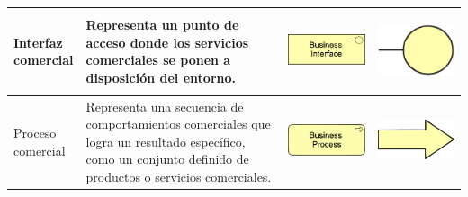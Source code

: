 \begin{longtable}{|p{0.15\linewidth}|p{0.45\linewidth}|p{0.2\linewidth} p{0.2\linewidth}|}
    Interfaz comercial
    &
    Representa un punto de acceso donde los servicios comerciales se ponen a disposición del entorno.
    &
\begin{center}
    \includegraphics[width=1\linewidth]{imgs/capa_de_negocios/4.pdf}
\end{center} &
\begin{center}
    \includegraphics[width=0.5\linewidth]{imgs/capa_de_negocios/a4.pdf}
\end{center}
    \\ \hline

    Proceso comercial
    &
    Representa una secuencia de comportamientos comerciales que logra un resultado específico, como un conjunto definido de productos o servicios comerciales.
    &
\begin{center}
    \includegraphics[width=1\linewidth]{imgs/capa_de_negocios/5.pdf}
\end{center} &
\begin{center}
    \includegraphics[width=0.5\linewidth]{imgs/capa_de_negocios/a5.pdf}
\end{center}
    \\ \hline



\end{longtable}
